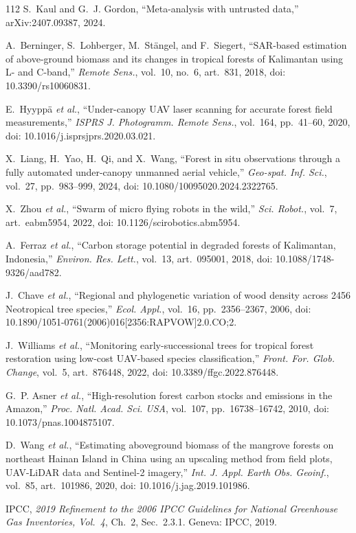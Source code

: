 \documentclass[conference,a4paper]{IEEEtran}
\begin{document}
\begin{thebibliography}{112}
S.~Kaul and G.~J. Gordon, ``Meta-analysis with untrusted data,'' arXiv:2407.09387, 2024.

A.~Berninger, S.~Lohberger, M.~St\"angel, and F.~Siegert, ``SAR-based estimation of above-ground biomass and its changes in tropical forests of Kalimantan using L- and C-band,'' \textit{Remote Sens.}, vol.~10, no.~6, art.~831, 2018, doi: 10.3390/rs10060831.

E.~Hyypp\"a \textit{et al.}, ``Under-canopy UAV laser scanning for accurate forest field measurements,'' \textit{ISPRS J. Photogramm. Remote Sens.}, vol.~164, pp.~41--60, 2020, doi: 10.1016/j.isprsjprs.2020.03.021.

X.~Liang, H.~Yao, H.~Qi, and X.~Wang, ``Forest in situ observations through a fully automated under-canopy unmanned aerial vehicle,'' \textit{Geo-spat. Inf. Sci.}, vol.~27, pp.~983--999, 2024, doi: 10.1080/10095020.2024.2322765.

X.~Zhou \textit{et al.}, ``Swarm of micro flying robots in the wild,'' \textit{Sci. Robot.}, vol.~7, art.~eabm5954, 2022, doi: 10.1126/scirobotics.abm5954.

A.~Ferraz \textit{et al.}, ``Carbon storage potential in degraded forests of Kalimantan, Indonesia,'' \textit{Environ. Res. Lett.}, vol.~13, art.~095001, 2018, doi: 10.1088/1748-9326/aad782.

J.~Chave \textit{et al.}, ``Regional and phylogenetic variation of wood density across 2456 Neotropical tree species,'' \textit{Ecol. Appl.}, vol.~16, pp.~2356--2367, 2006, doi: 10.1890/1051-0761(2006)016[2356:RAPVOW]2.0.CO;2.

J.~Williams \textit{et al.}, ``Monitoring early-successional trees for tropical forest restoration using low-cost UAV-based species classification,'' \textit{Front. For. Glob. Change}, vol.~5, art.~876448, 2022, doi: 10.3389/ffgc.2022.876448.

G.~P. Asner \textit{et al.}, ``High-resolution forest carbon stocks and emissions in the Amazon,'' \textit{Proc. Natl. Acad. Sci. USA}, vol.~107, pp.~16738--16742, 2010, doi: 10.1073/pnas.1004875107.

D.~Wang \textit{et al.}, ``Estimating aboveground biomass of the mangrove forests on northeast Hainan Island in China using an upscaling method from field plots, UAV-LiDAR data and Sentinel-2 imagery,'' \textit{Int. J. Appl. Earth Obs. Geoinf.}, vol.~85, art.~101986, 2020, doi: 10.1016/j.jag.2019.101986.

IPCC, \textit{2019 Refinement to the 2006 IPCC Guidelines for National Greenhouse Gas Inventories, Vol.~4}, Ch.~2, Sec.~2.3.1. Geneva: IPCC, 2019.

\end{thebibliography}
\end{document}
